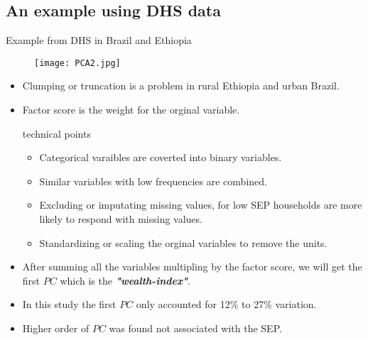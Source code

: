 \documentclass[13pt]{beamer}
\begin{document}
\subsection{An example using DHS data}
\begin{frame}
	Example from DHS in Brazil and Ethiopia
	\begin{figure}[!ht]
		\texttt{[image: PCA2.jpg]}
	\end{figure}
\end{frame}
\begin{frame}
		\begin{itemize}
			\item Clumping or truncation is a problem in rural Ethiopia and urban Brazil.
			\item Factor score is the weight for the orginal variable.
		\begin{block}{technical points}
		\begin{itemize}
			\item Categorical varaibles are coverted into binary variables.
			\item Similar variables with low frequencies are combined.
			\item Excluding or imputating missing values, for low SEP households are more likely to respond with missing values.
			\item Standardizing or scaling the orginal variables to remove the units.
		\end{itemize}
		\end{block}
	\end{itemize}
\end{frame}
\begin{frame}
	\begin{itemize}
		\item 	After summing all the variables multipling by the factor score, we will get the first $PC$ which is the \textit{\textbf{"wealth-index"}}.
		\item In this study the first $PC$ only accounted for 12\% to 27\% variation.
		\item Higher order of $PC$ was found not associated with the SEP.
	\end{itemize}
\end{frame}
\end{document}

